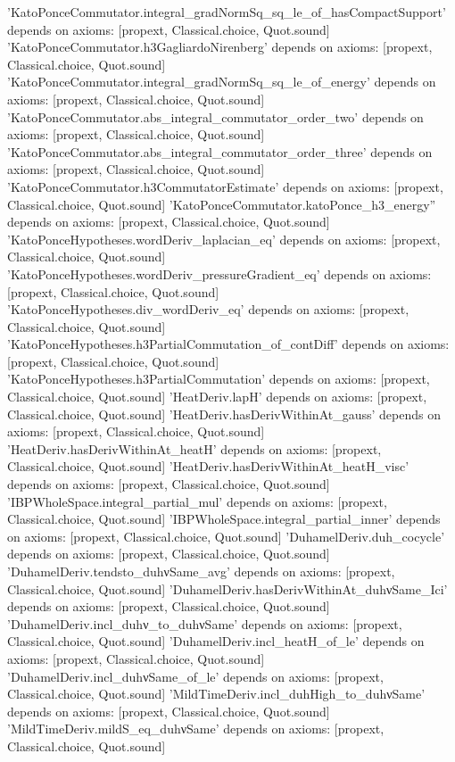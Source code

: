 \documentclass[11pt,a4paper]{article}
\theoremstyle{definition}
\theoremstyle{remark}
\begin{document}
\begin{leancode}
'KatoPonceCommutator.integral_gradNormSq_sq_le_of_hasCompactSupport' depends on axioms: [propext, Classical.choice, Quot.sound]
'KatoPonceCommutator.h3GagliardoNirenberg' depends on axioms: [propext, Classical.choice, Quot.sound]
'KatoPonceCommutator.integral_gradNormSq_sq_le_of_energy' depends on axioms: [propext, Classical.choice, Quot.sound]
'KatoPonceCommutator.abs_integral_commutator_order_two' depends on axioms: [propext, Classical.choice, Quot.sound]
'KatoPonceCommutator.abs_integral_commutator_order_three' depends on axioms: [propext, Classical.choice, Quot.sound]
'KatoPonceCommutator.h3CommutatorEstimate' depends on axioms: [propext, Classical.choice, Quot.sound]
'KatoPonceCommutator.katoPonce_h3_energy'' depends on axioms: [propext, Classical.choice, Quot.sound]
'KatoPonceHypotheses.wordDeriv_laplacian_eq' depends on axioms: [propext, Classical.choice, Quot.sound]
'KatoPonceHypotheses.wordDeriv_pressureGradient_eq' depends on axioms: [propext, Classical.choice, Quot.sound]
'KatoPonceHypotheses.div_wordDeriv_eq' depends on axioms: [propext, Classical.choice, Quot.sound]
'KatoPonceHypotheses.h3PartialCommutation_of_contDiff' depends on axioms: [propext, Classical.choice, Quot.sound]
'KatoPonceHypotheses.h3PartialCommutation' depends on axioms: [propext, Classical.choice, Quot.sound]
'HeatDeriv.lapH' depends on axioms: [propext, Classical.choice, Quot.sound]
'HeatDeriv.hasDerivWithinAt_gauss' depends on axioms: [propext, Classical.choice, Quot.sound]
'HeatDeriv.hasDerivWithinAt_heatH' depends on axioms: [propext, Classical.choice, Quot.sound]
'HeatDeriv.hasDerivWithinAt_heatH_visc' depends on axioms: [propext, Classical.choice, Quot.sound]
'IBPWholeSpace.integral_partial_mul' depends on axioms: [propext, Classical.choice, Quot.sound]
'IBPWholeSpace.integral_partial_inner' depends on axioms: [propext, Classical.choice, Quot.sound]
'DuhamelDeriv.duh_cocycle' depends on axioms: [propext, Classical.choice, Quot.sound]
'DuhamelDeriv.tendsto_duhνSame_avg' depends on axioms: [propext, Classical.choice, Quot.sound]
'DuhamelDeriv.hasDerivWithinAt_duhνSame_Ici' depends on axioms: [propext, Classical.choice, Quot.sound]
'DuhamelDeriv.incl_duhν_to_duhνSame' depends on axioms: [propext, Classical.choice, Quot.sound]
'DuhamelDeriv.incl_heatH_of_le' depends on axioms: [propext, Classical.choice, Quot.sound]
'DuhamelDeriv.incl_duhνSame_of_le' depends on axioms: [propext, Classical.choice, Quot.sound]
'MildTimeDeriv.incl_duhHigh_to_duhνSame' depends on axioms: [propext, Classical.choice, Quot.sound]
'MildTimeDeriv.mildS_eq_duhνSame' depends on axioms: [propext, Classical.choice, Quot.sound]

\end{leancode}
\end{document}
